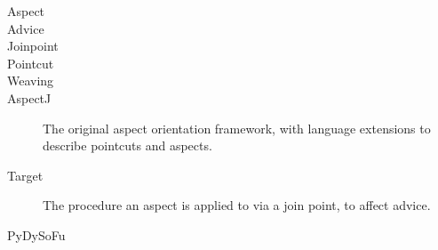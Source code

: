 \begin{description}
    \item[Aspect]  
    \item[Advice] 
    \item[Joinpoint]
    \item[Pointcut]  
    \item[Weaving] 
    \item[AspectJ] The original aspect orientation framework, with language
    extensions to describe pointcuts and aspects.  
    \item[Target] The procedure an aspect is applied to via a join point, to
    affect advice.
    \item[PyDySoFu] 
    \item[]
\end{description}